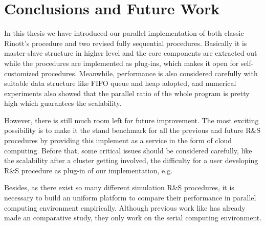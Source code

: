 \chapter{Conclusions and Future Work}

In this thesis we have introduced our parallel implementation of both classic Rinott's procedure and two revised fully sequential procedures. Basically it is master-slave structure in higher level and the core components are extracted out while the procedures are implemented as plug-ins, which makes it open for self-customized procedures. Meanwhile, performance is also considered carefully with suitable data structure like FIFO queue and heap adopted, and numerical experiments also showed that the parallel ratio of the whole program is pretty high which guarantees the scalability.

However, there is still much room left for future improvement. The most exciting possibility is to make it the stand benchmark for all the previous and future R\&S procedures by providing this implement as a service in the form of cloud computing. Before that, some critical issues should be considered carefully, like the scalability after a cluster getting involved, the difficulty for a user developing R\&S procedure as plug-in of our implementation, e.g.

Besides, as there exist so many different simulation R\&S procedures, it is necessary to build an uniform platform to compare their performance in parallel computing environment empirically. Although previous work like \cite{ms05ras} has already made an comparative study, they only work on the serial computing environment.
